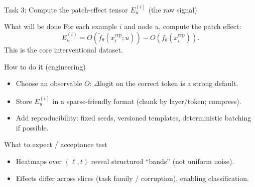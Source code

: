 \documentclass[aspectratio=169,xcolor={dvipsnames}]{beamer}
\begin{document}
\begin{frame}[shrink=20]{Task 3: Compute the patch-effect tensor $E_u^{(i)}$ (the raw signal)}
\small
\begin{block}{What will be done}
For each example $i$ and node $u$, compute the patch effect:
\[
E_u^{(i)} = O(\tilde f_\theta(x_i^{\mathrm{crp}};u)) - O(f_\theta(x_i^{\mathrm{crp}})).
\]
This is the core interventional dataset.
\end{block}

\begin{block}{How to do it (engineering)}
\begin{itemize}\setlength\itemsep{3pt}
\item Choose an observable $O$: $\Delta$logit on the correct token is a strong default.
\item Store $E_u^{(i)}$ in a sparse-friendly format (chunk by layer/token; compress).
\item Add reproducibility: fixed seeds, versioned templates, deterministic batching if possible.
\end{itemize}
\end{block}

\begin{block}{What to expect / acceptance test}
\begin{itemize}\setlength\itemsep{2pt}
\item Heatmaps over $(\ell,t)$ reveal structured “bands” (not uniform noise).
\item Effects differ across slices (task family / corruption), enabling classification.
\end{itemize}
\end{block}
\end{frame}
\end{document}

